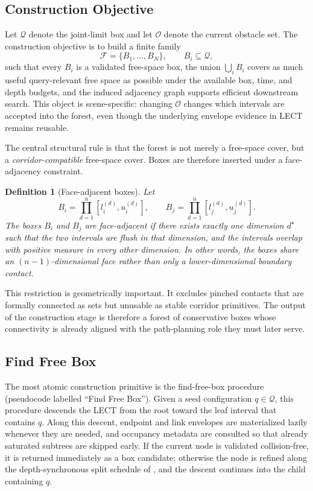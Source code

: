 \documentclass[journal]{IEEEtran}
\newtheorem{definition}{Definition}
\newcommand{\calO}{\ensuremath{\mathcal{O}}}
\newcommand{\Q}{\ensuremath{\mathcal{Q}}}
\begin{document}
\subsection{Construction Objective}\label{sec:forest_objective}

Let $\Q$ denote the joint-limit box and let $\calO$ denote the current obstacle
set. The construction objective is to build a finite family
\[
\mathcal{F} = \{B_1,\dots,B_N\}, \qquad B_i \subseteq \Q,
\]
such that every $B_i$ is a validated free-space box, the union
$\bigcup_i B_i$ covers as much useful query-relevant free space as possible
under the available box, time, and depth budgets, and the induced adjacency
graph supports efficient downstream search. This object is scene-specific:
changing $\calO$ changes which intervals are accepted into the forest, even
though the underlying envelope evidence in LECT remains reusable.

The central structural rule is that the forest is not merely a free-space cover,
but a \emph{corridor-compatible} free-space cover. Boxes are therefore inserted
under a face-adjacency constraint.

\begin{definition}[Face-adjacent boxes]\label{def:face_adjacent}
Let
\[
B_i = \prod_{d=1}^{n}[l_i^{(d)},u_i^{(d)}],
\qquad
B_j = \prod_{d=1}^{n}[l_j^{(d)},u_j^{(d)}].
\]
The boxes $B_i$ and $B_j$ are face-adjacent if there exists exactly one
dimension $d^\star$ such that the two intervals are flush in that dimension,
and the intervals overlap with positive measure in every other dimension. In
other words, the boxes share an $(n-1)$-dimensional face rather than only a
lower-dimensional boundary contact.
\end{definition}

This restriction is geometrically important. It excludes pinched contacts that
are formally connected as sets but unusable as stable corridor primitives. The
output of the construction stage is therefore a forest of conservative boxes whose
connectivity is already aligned with the path-planning role they must later
serve.

\subsection{Find Free Box}\label{sec:forest_ffb}

The most atomic construction primitive is the find-free-box procedure (pseudocode
labelled ``Find Free Box''). Given a seed configuration $q\in\Q$, this
procedure descends the LECT from the root toward the leaf interval that
contains $q$. Along this descent, endpoint and link envelopes are
materialized lazily whenever they are needed, and occupancy metadata are
consulted so that already saturated subtrees are skipped early. If the current
node is validated collision-free, it is returned immediately as a box candidate;
otherwise the node is refined along the depth-synchronous split schedule of
, and the descent continues into the child containing $q$.
\end{document}
